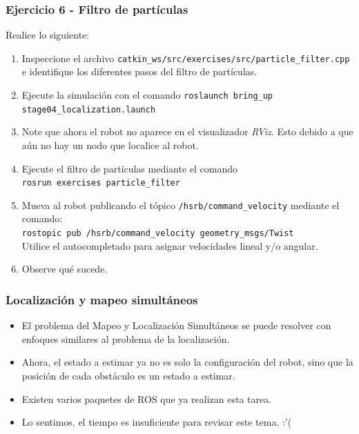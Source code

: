 \documentclass[10pt,spanish,aspectratio=1610]{beamer}
\begin{document}
\begin{frame}[containsverbatim]\frametitle{Ejercicio 6 - Filtro de partículas}
Realice lo siguiente:
  \begin{enumerate}
  \item Inspeccione el archivo \texttt{catkin\_ws/src/exercises/src/particle\_filter.cpp} e identifique los diferentes pasos del filtro de partículas.  
  \item Ejecute la simulación con el comando \texttt{roslaunch bring\_up stage04\_localization.launch}
  \item Note que ahora el robot no aparece en el visualizador \textit{RViz}. Esto debido a que aún no hay un nodo que localice al robot. 
  \item Ejecute el filtro de partículas mediante el comando\\ \texttt{rosrun exercises particle\_filter}
  \item Mueva al robot publicando el tópico \texttt{/hsrb/command\_velocity} mediante el comando:\\
    \texttt{rostopic pub /hsrb/command\_velocity geometry\_msgs/Twist }\\
    Utilice el autocompletado para asignar velocidades lineal y/o angular. 
  \item Observe qué sucede. 
  \end{enumerate}
\end{frame}

\begin{frame}\frametitle{Localización y mapeo simultáneos}
  \begin{itemize}
  \item  El problema del Mapeo y Localización Simultáneos se puede resolver con enfoques similares al problema de la localización.
  \item Ahora, el estado a estimar ya no es solo la configuración del robot, sino que la posición de cada obstáculo es un estado a estimar.
  \item Existen varios paquetes de ROS que ya realizan esta tarea.
  \item Lo sentimos, el tiempo es insuficiente para revisar este tema. :'(
  \end{itemize}
\end{frame}
\end{document}

